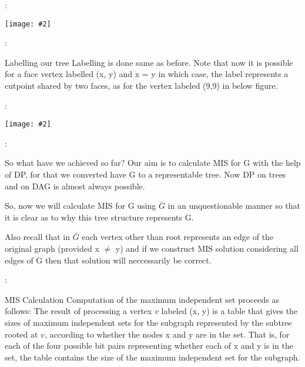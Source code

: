 \documentclass{beamer}
\newcommand{\iph}[2]{
    \texttt{[image: \#2]}
}
\begin{document}
\begin{frame}{\secname : \subsecname}
    \iph{0.9}{lin3}

\end{frame}

\begin{frame}{\secname : \subsecname}
    \begin{block}{Labelling our tree}
        Labelling is done same as before. Note that now it is possible for a face vertex labelled (x, y) and x = y in which case, the label
        represents a cutpoint shared by two faces, as for the vertex labeled (9,9) in
        below figure.
    \end{block}

\end{frame}

\begin{frame}{\secname : \subsecname}
    \iph{0.9}{lin4}

\end{frame}

\begin{frame}{\secname : \subsecname}
    \begin{block}{So what have we achieved so far?}
        Our aim is to calculate MIS for G with the help of DP, for that we converted have G to a representable tree. Now DP on trees and on DAG is almost always possible. 
        
        So, now we will calculate MIS for G using $\bar{G}$ in an unquestionable manner so that it is clear as to why this tree structure represents G. 
        
        Also recall that in $\bar{G}$ each vertex other than root represents an edge of the original graph (provided x $\neq$ y) and if we construct MIS solution considering all edges of G then that solution will neccessarily be correct.
    \end{block}
\end{frame}



\begin{frame}{\secname : \subsecname}
    \begin{block}{MIS Calculation}
        Computation of the maximum independent set proceeds as follows: The
        result of processing a vertex $v$ labeled (x, y) is a table that gives the sizes of
        maximum independent sets for the subgraph represented by the subtree rooted at $v$, according to whether the nodes x and y are in the set. That is, for each of
        the four possible bit pairs representing whether each of x and y is in the set,
        the table contains the size of the maximum independent set for the subgraph. 
    \end{block}
\end{frame}
\end{document}
